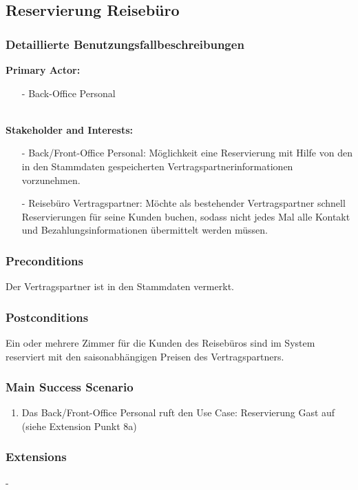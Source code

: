 \documentclass[./detailed_overview_usecases.tex]{subfiles}
\begin{document}
    \subsection{Reservierung Reisebüro}
    \subsubsection{Detaillierte Benutzungsfallbeschreibungen}

    \textbf{Primary Actor:}
    \begin{itemize}
        \item [-]  Back-Office Personal
    \end{itemize}
    \\
    \textbf{Stakeholder and Interests:}
    \begin{itemize}
        \item[-] Back/Front-Office Personal: Möglichkeit eine Reservierung mit Hilfe von den in den Stammdaten gespeicherten Vertragspartnerinformationen vorzunehmen.
        \item[-] Reisebüro Vertragspartner: Möchte als bestehender Vertragspartner schnell Reservierungen für seine Kunden buchen, sodass nicht jedes
        Mal alle Kontakt und Bezahlungsinformationen übermittelt werden müssen.
    \end{itemize}

    \subsubsection*{Preconditions}
    Der Vertragspartner ist in den Stammdaten vermerkt.

    \subsubsection*{Postconditions}
    Ein oder mehrere Zimmer für die Kunden des Reisebüros sind im System reserviert mit den saisonabhängigen Preisen des Vertragspartners.

    \subsubsection*{Main Success Scenario}
    \begin{enumerate}
        \item Das Back/Front-Office Personal ruft den Use Case: Reservierung Gast auf (siehe Extension Punkt 8a)
    \end{enumerate}

    \subsubsection*{Extensions}
    -
\end{document}
